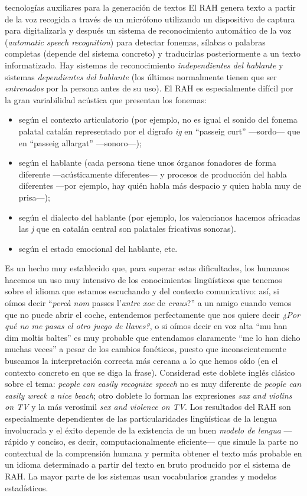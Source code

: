 \begin{persabermes}{tecnologías auxiliares para la generación de textos}
El RAH genera texto a partir de la voz recogida a través de un micrófono utilizando un dispositivo de captura para digitalizarla y después un sistema de reconocimiento automático de la voz (\emph{automatic speech recognition}) para detectar fonemas, sílabas o palabras completas (depende del sistema concreto) y traducirlas posteriormente a un texto informatizado. Hay sistemas de reconocimiento {\em independientes del hablante} y sistemas \emph{dependientes del hablante} (los últimos normalmente tienen que ser \emph{entrenados} por la persona antes de su uso). El RAH es especialmente difícil por la gran variabilidad acústica que presentan los fonemas: \begin{itemize} \item según el contexto articulatorio (por ejemplo, no es igual el sonido del fonema palatal catalán representado por el dígrafo \emph{ig} en ``passeig curt'' ---sordo--- que en ``passeig allargat'' ---sonoro---); \item según el hablante (cada persona tiene unos órganos fonadores de forma diferente ---acústicamente diferentes--- y procesos de producción del habla diferentes ---por ejemplo, hay quién habla más despacio y quien habla muy de prisa---); \item según el dialecto del hablante (por ejemplo, los valencianos hacemos africadas las \emph{j} que en catalán central son palatales fricativas sonoras). \item según el estado emocional del hablante, etc. \end{itemize} Es un hecho muy establecido que, para superar estas dificultades, los humanos hacemos un uso muy intensivo de los conocimientos lingüísticos que tenemos sobre el idioma que estamos escuchando y del contexto comunicativo: así, si oímos decir ``\emph{percà nom} passes l'\emph{antre xoc} de \emph{craus}?'' a un amigo cuando vemos que no puede abrir el coche, entendemos perfectamente que nos quiere decir \emph{¿Por qué no me pasas el otro juego de llaves?}, o si oímos decir en voz alta ``mu han dim moltis baltes'' es muy probable que entendamos claramente ``me lo han dicho muchas veces'' a pesar de los cambios fonéticos, puesto que inconscientemente buscamos la interpretación correcta más cercana a lo que hemos oído (en el contexto concreto en que se diga la frase). Considerad este doblete inglés clásico sobre el tema: \emph{people can easily recognize speech} no es muy diferente de {\em people can easily wreck a nice beach}; otro doblete lo forman las expresiones \emph{sax and violins on TV} y la más verosímil \emph{sex and violence on TV}. Los resultados del RAH son especialmente dependientes de las particularidades lingüísticas de la lengua involucrada y el éxito depende de la existencia de un buen \emph{modelo de lengua} ---rápido y conciso, es decir, computacionalmente eficiente--- que simule la parte no contextual de la comprensión humana y permita obtener el texto más probable en un idioma determinado a partir del texto en bruto producido por el sistema de RAH. La mayor parte de los sistemas usan vocabularios grandes y modelos estadísticos. 


\end{persabermes}
